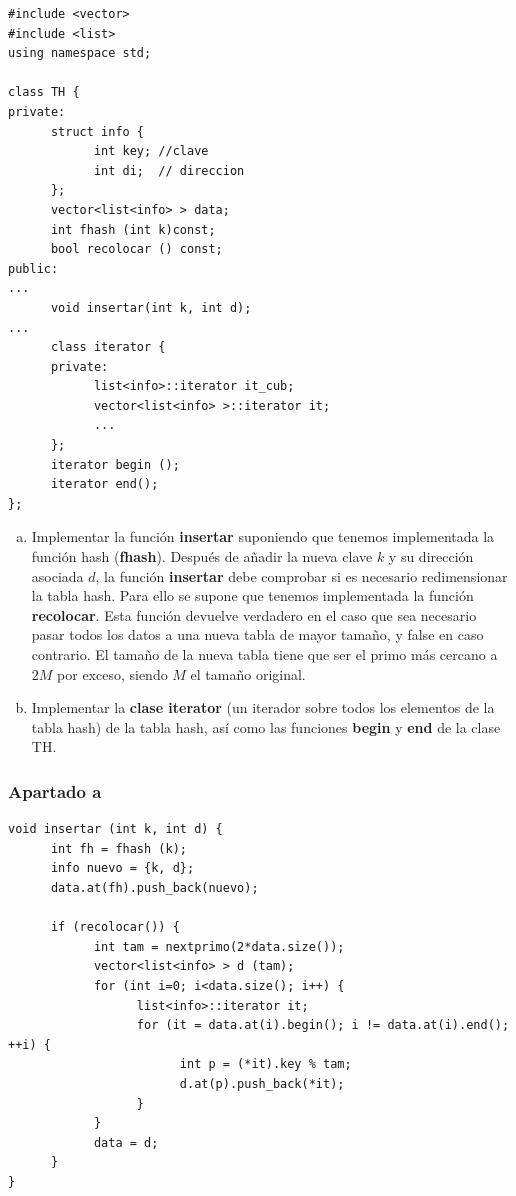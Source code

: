 \documentclass[10pt,a4paper,spanish]{report}
\begin{document}
\begin{verbatim}
#include <vector>
#include <list>
using namespace std;

class TH {
private:
      struct info {
            int key; //clave
            int di;  // direccion
      };
      vector<list<info> > data;
      int fhash (int k)const;
      bool recolocar () const;
public:
...
      void insertar(int k, int d);
...
      class iterator {
      private:
            list<info>::iterator it_cub;
            vector<list<info> >::iterator it;
            ...
      };
      iterator begin ();
      iterator end();
};
\end{verbatim}

\begin{enumerate}[a)]
\item Implementar la función \textbf{insertar} suponiendo que tenemos implementada la función hash (\textbf{fhash}). Después de añadir la nueva clave $k$ y su dirección asociada $d$, la función \textbf{insertar} debe comprobar si es necesario redimensionar la tabla hash. Para ello se supone que tenemos implementada la función \textbf{recolocar}. Esta función devuelve verdadero en el caso que sea necesario pasar todos los datos a una nueva tabla de mayor tamaño, y false en caso contrario. El tamaño de la nueva tabla tiene que ser el primo más cercano a $2M$ por exceso, siendo $M$ el tamaño original.
\item Implementar la \textbf{clase iterator} (un iterador sobre todos los elementos de la tabla hash) de la tabla hash, así como las funciones \textbf{begin} y \textbf{end} de la clase TH.
\end{enumerate}

\subsubsection{\textcolor[rgb]{0.5,0.8,1}Apartado a}
\begin{verbatim}
void insertar (int k, int d) {
      int fh = fhash (k);
      info nuevo = {k, d};
      data.at(fh).push_back(nuevo);

      if (recolocar()) {
            int tam = nextprimo(2*data.size());
            vector<list<info> > d (tam);
            for (int i=0; i<data.size(); i++) {
                  list<info>::iterator it;
                  for (it = data.at(i).begin(); i != data.at(i).end(); ++i) {
                        int p = (*it).key % tam;
                        d.at(p).push_back(*it);
                  }
            }
            data = d;
      }
}
\end{verbatim}
\end{document}
